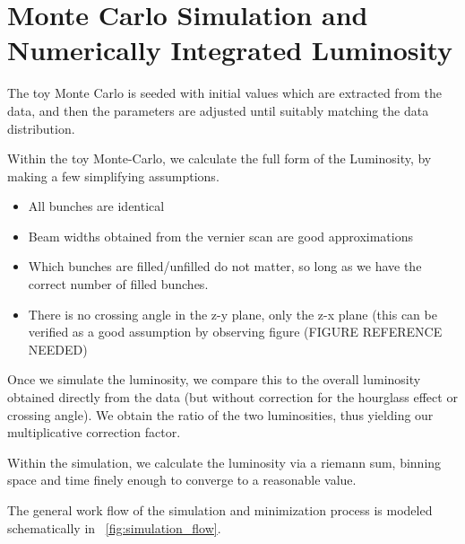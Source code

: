 \section{Monte Carlo Simulation and Numerically Integrated Luminosity}
The toy Monte Carlo is seeded with initial values which are extracted from the
data, and then the parameters are adjusted until suitably matching the data
distribution.

Within the toy Monte-Carlo, we calculate the full form of the Luminosity, by
making a few simplifying assumptions.

\begin{itemize}
  \item All bunches are identical
  \item Beam widths obtained from the vernier scan are good approximations
  \item Which bunches are filled/unfilled do not matter, so long as we have the
    correct number of filled bunches.
  \item There is no crossing angle in the z-y plane, only the z-x plane (this
    can be verified as a good assumption by observing figure (FIGURE
    REFERENCE NEEDED)
\end{itemize}

Once we simulate the luminosity, we compare this to the overall luminosity
obtained directly from the data (but without correction for the hourglass effect
or crossing angle). We obtain the ratio of the two luminosities, thus yielding
our multiplicative correction factor.

Within the simulation, we calculate the luminosity via a riemann sum, binning
space and time finely enough to converge to a reasonable value.

The general work flow of the simulation and minimization process is modeled
schematically in ~\ref{fig:simulation_flow}. 

